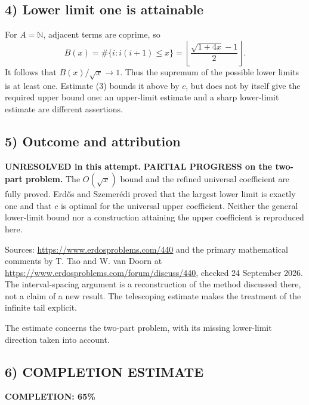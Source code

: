 \subsection*{4) Lower limit one is attainable}
For $A=\mathbb N$, adjacent terms are coprime, so
\[B(x)=\#\{i:i(i+1)\le x\}
=\left\lfloor\frac{\sqrt{1+4x}-1}{2}\right\rfloor.\]
It follows that $B(x)/\sqrt x\to1$. Thus the supremum of the possible lower limits is at least one. Estimate (3) bounds it above by $c$, but does not by itself give the required upper bound one: an upper-limit estimate and a sharp lower-limit estimate are different assertions.

\subsection*{5) Outcome and attribution}
\textbf{UNRESOLVED in this attempt.} \textbf{PARTIAL PROGRESS on the two-part problem.} The $O(\sqrt x)$ bound and the refined universal coefficient are fully proved. Erd\H{o}s and Szemer\'edi proved that the largest lower limit is exactly one and that $c$ is optimal for the universal upper coefficient. Neither the general lower-limit bound nor a construction attaining the upper coefficient is reproduced here.

Sources: \url{https://www.erdosproblems.com/440} and the primary mathematical comments by T. Tao and W. van Doorn at \url{https://www.erdosproblems.com/forum/discuss/440}, checked 24 September 2026. The interval-spacing argument is a reconstruction of the method discussed there, not a claim of a new result. The telescoping estimate makes the treatment of the infinite tail explicit.

The estimate concerns the two-part problem, with its missing lower-limit direction taken into account.
\subsection*{6) COMPLETION ESTIMATE}
\textbf{COMPLETION: 65\%}
